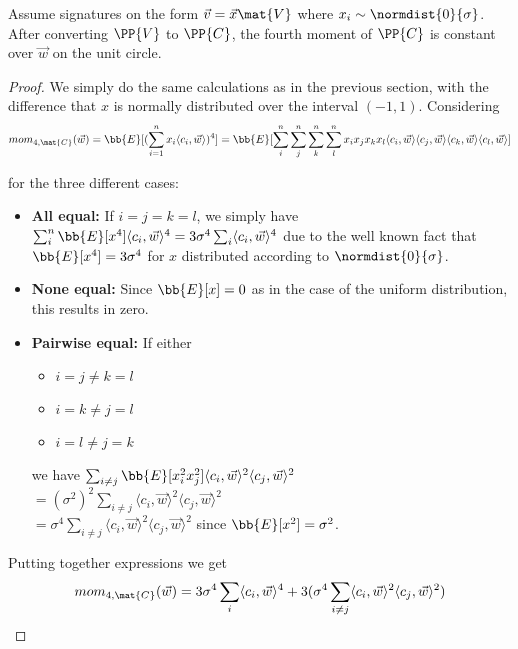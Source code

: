 \begin{lemma}[Lemma 1]
\label{hpp_norm_lemma}
Assume signatures on the form $\vec{v} = \vec{x} \mat{V}$ where $x_i \sim \normdist{0}{\sigma}$. After converting $\PP{V}$ to $\PP{C}$, 
the fourth moment of $\PP{C}$ is constant over $\vec{w}$ on the unit circle.
\end{lemma}
\begin{proof}
    We simply do the same calculations as in the previous section, with the difference that $x$ is normally distributed over the interval $(-1, 1)$.
    Considering
    \[ mom_{4, \mat{C}}(\vec{w}) = \bb{E}[(\sum_{i=1}^{n} x_i \langle c_i, \vec{w} \rangle ) ^4] = 
        \bb{E}[\sum_{i}^{n} \sum_{j}^{n} \sum_{k}^{n} \sum_{l}^{n} x_i x_j x_k x_l 
        \langle c_i, \vec{w} \rangle \langle c_j, \vec{w} \rangle
    \langle c_k, \vec{w} \rangle \langle c_l, \vec{w} \rangle] \]

    for the three different cases:
    \begin{itemize}
        \item \textbf{All equal: } If $i = j = k = l$, we simply have $\sum_i^n \bb{E}[x^4] \langle c_i, \vec{w} \rangle ^4 = 3 \sigma ^4 \sum_i \langle c_i, \vec{w} \rangle ^4$
            due to the well known fact that $\bb{E}[x^4] = 3 \sigma ^4$ for $x$ distributed according to $\normdist{0}{\sigma}$.
        \item \textbf{None equal:} Since $\bb{E}[x] = 0$ as in the case of the uniform distribution, this results in zero.
        \item \textbf{Pairwise equal:} If either 
            \begin{itemize}
                \item $i = j \neq k = l$
                \item $i = k \neq j = l$ 
                \item $i = l \neq j = k$
            \end{itemize}
            we have $\sum_{i \neq j} \bb{E}[x_i^2 x_j^2] \langle c_i, \vec{w} \rangle ^2 \langle c_j, \vec{w} \rangle ^2$ \\
            $= (\sigma^2 )^2 \sum_{i \neq j}\langle c_i, \vec{w} \rangle ^2 \langle c_j, \vec{w} \rangle ^2$ \\
            $= \sigma^4 \sum_{i \neq j}\langle c_i, \vec{w} \rangle ^2 \langle c_j, \vec{w} \rangle ^2$ since $\bb{E}[x^2] = \sigma^2$.
    \end{itemize}

    Putting together expressions we get 
    \[
        mom_{4, \mat{C}}(\vec{w}) = 3 \sigma ^4 \sum_i \langle c_i, \vec{w} \rangle ^4 + 3(\sigma^4 \sum_{i \neq j}\langle c_i, \vec{w} \rangle ^2 \langle c_j, \vec{w} \rangle ^2)
    \]


\end{proof}
